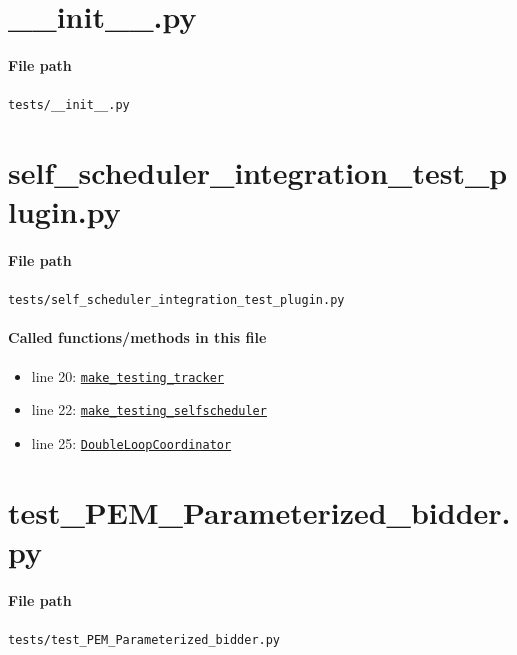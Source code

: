 \documentclass[11pt]{report}
\begin{document}
\section{\_\_init\_\_.py}
\label{file:tests-__init__.py}
\paragraph{File path} \texttt{tests/\_\_init\_\_.py}

\section{self\_scheduler\_integration\_test\_plugin.py}
\label{file:tests-self_scheduler_integration_test_plugin.py}
\paragraph{File path} \texttt{tests/self\_scheduler\_integration\_test\_plugin.py}
\paragraph{Called functions/methods in this file}
\begin{itemize}[leftmargin=*]
  \item line 20: \hyperref[def:tests-util.py:make_testing_tracker:L351]{\texttt{make\_testing\_tracker}}
  \item line 22: \hyperref[def:tests-util.py:make_testing_selfscheduler:L399]{\texttt{make\_testing\_selfscheduler}}
  \item line 25: \hyperref[def:coordinator.py:DoubleLoopCoordinator:L30]{\texttt{DoubleLoopCoordinator}}
\end{itemize}

\section{test\_PEM\_Parameterized\_bidder.py}
\label{file:tests-test_PEM_Parameterized_bidder.py}
\paragraph{File path} \texttt{tests/test\_PEM\_Parameterized\_bidder.py}
\end{document}
